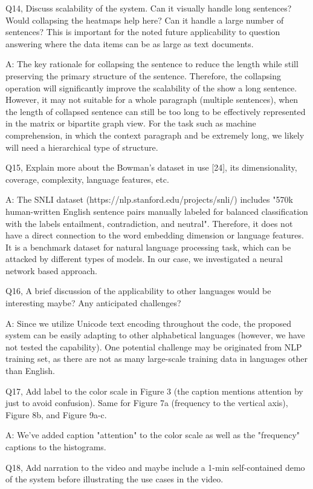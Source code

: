 Q14, Discuss scalability of the system. Can it visually handle long sentences? Would collapsing the heatmaps help here? Can it handle a large number of sentences? This is important for the noted future applicability to question answering where the data items can be as large as text documents.

A: The key rationale for collapsing the sentence to reduce the length while still preserving the primary structure of the sentence. Therefore, the collapsing operation will significantly improve the scalability of the show a long sentence. However, it may not suitable for a whole paragraph (multiple sentences), when the length of collapsed sentence can still be too long to be effectively represented in the matrix or bipartite graph view. For the task such as machine comprehension, in which the context paragraph and be extremely long, we likely will need a hierarchical type of structure.

Q15, Explain more about the Bowman's dataset in use [24], its dimensionality, coverage, complexity, language features, etc.

A: The SNLI dataset (https://nlp.stanford.edu/projects/snli/) includes "570k human-written English sentence pairs manually labeled for balanced classification with the labels entailment, contradiction, and neutral". Therefore, it does not have a direct connection to the word embedding dimension or language features. It is a benchmark dataset for natural language processing task, which can be attacked by different types of models. In our case, we investigated a neural network based approach.

Q16, A brief discussion of the applicability to other languages would be interesting maybe? Any anticipated challenges?

A: Since we utilize Unicode text encoding throughout the code, the proposed system can be easily adapting to other alphabetical languages (however, we have not tested the capability). One potential challenge may be originated from NLP training set, as there are not as many large-scale training data in languages other than English.

Q17, Add label to the color scale in Figure 3 (the caption mentions attention by just to avoid confusion). Same for Figure 7a (frequency to the vertical axis), Figure 8b, and Figure 9a-c.

A: We've added caption "attention" to the color scale as well as the "frequency" captions to the histograms.

Q18, Add narration to the video and maybe include a 1-min self-contained demo of the system before illustrating the use cases in the video.

